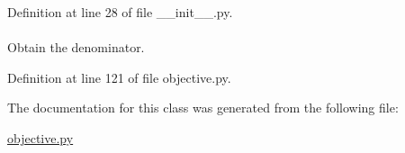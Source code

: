 \-Definition at line 28 of file \-\_\-\-\_\-init\-\_\-\-\_\-.\-py.

\hypertarget{classforcebalance_1_1objective_1_1Objective_a96dac77b10897fc43fca9e2dcf3dfee2}{
\paragraph[{\-W\-Tot}]{}}\label{classforcebalance_1_1objective_1_1Objective_a96dac77b10897fc43fca9e2dcf3dfee2}


\-Obtain the denominator. 



\-Definition at line 121 of file objective.\-py.



\-The documentation for this class was generated from the following file\-:\begin{DoxyCompactItemize}
\item 
\hyperlink{objective_8py}{objective.\-py}\end{DoxyCompactItemize}
